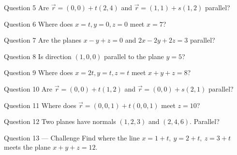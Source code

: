 \documentclass[11pt]{article}
\begin{document}
\begin{qbox}{Question 5}
Are $\vec r=(0,0)+t(2,4)$ and $\vec r=(1,1)+s(1,2)$ parallel?\workspace{2.4cm}
\end{qbox}

\begin{qbox}{Question 6}
Where does $x=t,y=0,z=0$ meet $x=7$?\workspace{2.4cm}
\end{qbox}

\begin{qbox}{Question 7}
Are the planes $x-y+z=0$ and $2x-2y+2z=3$ parallel?\workspace{2.4cm}
\end{qbox}

\begin{qbox}{Question 8}
Is direction $(1,0,0)$ parallel to the plane $y=5$?\workspace{2.4cm}
\end{qbox}

\begin{qbox}{Question 9}
Where does $x=2t,y=t,z=t$ meet $x+y+z=8$?\workspace{2.4cm}
\end{qbox}

\begin{qbox}{Question 10}
Are $\vec r=(0,0)+t(1,2)$ and $\vec r=(0,0)+s(2,1)$ parallel?\workspace{2.4cm}
\end{qbox}

\begin{qbox}{Question 11}
Where does $\vec r=(0,0,1)+t(0,0,1)$ meet $z=10$?\workspace{2.4cm}
\end{qbox}

\begin{qbox}{Question 12}
Two planes have normals $(1,2,3)$ and $(2,4,6)$. Parallel?\workspace{2.4cm}
\end{qbox}

\begin{qbox}{Question 13 --- Challenge}
Find where the line $x=1+t,\ y=2+t,\ z=3+t$ meets the plane $x+y+z=12$.\workspace{3.5cm}
\end{qbox}

\clearpage
{}
\end{document}
